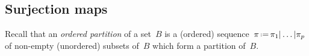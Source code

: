 \documentclass{amsart}
\theoremstyle{definition}
\newtheorem{definition}[theorem]{Definition}
\newcommand{\ssm}{\smallsetminus} %
\newcommand{\eqdef}{\mbox{\,\raisebox{0.2ex}{\scriptsize\ensuremath{\mathrm:}}\ensuremath{=}\,}} %
\newcommand{\darkblue}{\color{darkblue}} %
\newcommand{\defn}[1]{\textsl{\darkblue #1}} %
\newcommand{\vincent}[1]{\todo[color=blue!30]{#1 \\ \hfill --- V.}}
\begin{document}

\subsection{Surjection maps}
\label{subsec:surjectionMaps}

Recall that an \defn{ordered partition} of a set~$B$ is a (ordered) sequence~$\pi \eqdef \pi_1 | \dots | \pi_p$ of non-empty (unordered) subsets of~$B$ which form a partition of~$B$.

\end{document}
